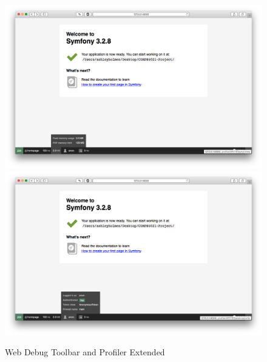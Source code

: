 \begin{figure}[htbp]
   \centering
   \includegraphics[width=400pt]{figures/webdebug_3.png} %
   \includegraphics[width=400pt]{figures/webdebug_4.png}
   \caption{Web Debug Toolbar and Profiler Extended}
   \label{fig:Web Debug Toolbar and Profiler Extended}
\end{figure}

